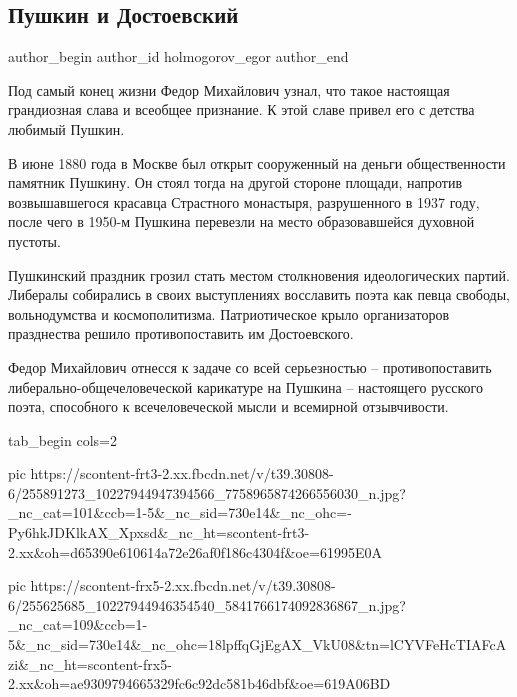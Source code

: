  
 
 
 
 
 
\subsection{Пушкин и Достоевский}
\label{sec:15_11_2021.fb.holmogorov_egor.1.pushkin_i_dostojevskij}
 
\ifcmt
 author_begin
   author_id holmogorov_egor
 author_end
\fi

Под самый конец жизни Федор Михайлович узнал, что такое настоящая грандиозная
слава и всеобщее признание. К этой славе привел его с детства любимый Пушкин.

В июне 1880 года в Москве был открыт сооруженный на деньги общественности
памятник Пушкину. Он стоял тогда на другой  стороне площади, напротив
возвышавшегося красавца  Страстного монастыря, разрушенного в 1937 году, после
чего в 1950-м Пушкина перевезли на место образовавшейся духовной пустоты.

Пушкинский праздник грозил стать местом столкновения идеологических партий.
Либералы собирались в своих выступлениях восславить поэта как певца свободы,
вольнодумства и космополитизма. Патриотическое крыло организаторов празднества
решило противопоставить им Достоевского.

Федор Михайлович отнесся к задаче со всей серьезностью – противопоставить
либерально-общечеловеческой карикатуре на Пушкина – настоящего русского поэта,
способного к всечеловеческой мысли и всемирной отзывчивости.

\ifcmt
  tab_begin cols=2

     pic https://scontent-frt3-2.xx.fbcdn.net/v/t39.30808-6/255891273_10227944947394566_7758965874266556030_n.jpg?_nc_cat=101&ccb=1-5&_nc_sid=730e14&_nc_ohc=-Py6hkJDKlkAX_Xpxsd&_nc_ht=scontent-frt3-2.xx&oh=d65390e610614a72e26af0f186c4304f&oe=61995E0A

     pic https://scontent-frx5-2.xx.fbcdn.net/v/t39.30808-6/255625685_10227944946354540_5841766174092836867_n.jpg?_nc_cat=109&ccb=1-5&_nc_sid=730e14&_nc_ohc=18lpffqGjEgAX_VkU08&tn=lCYVFeHcTIAFcAzi&_nc_ht=scontent-frx5-2.xx&oh=ae9309794665329fc6c92dc581b46dbf&oe=619A06BD

